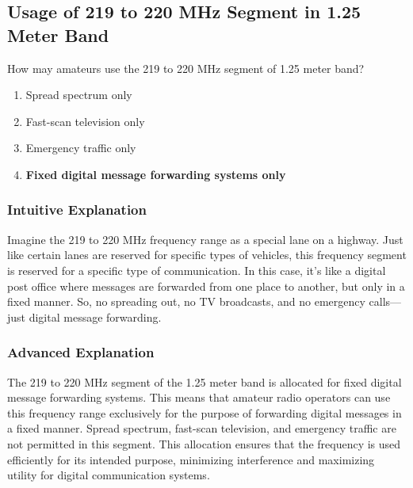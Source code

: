 \subsection{Usage of 219 to 220 MHz Segment in 1.25 Meter Band}
\label{T1B05}

\begin{tcolorbox}[colback=gray!10!white,colframe=black!75!black,title=T1B05]
How may amateurs use the 219 to 220 MHz segment of 1.25 meter band?
\begin{enumerate}[label=\Alph*,noitemsep]
    \item Spread spectrum only
    \item Fast-scan television only
    \item Emergency traffic only
    \item \textbf{Fixed digital message forwarding systems only}
\end{enumerate}
\end{tcolorbox}

\subsubsection{Intuitive Explanation}
Imagine the 219 to 220 MHz frequency range as a special lane on a highway. Just like certain lanes are reserved for specific types of vehicles, this frequency segment is reserved for a specific type of communication. In this case, it's like a digital post office where messages are forwarded from one place to another, but only in a fixed manner. So, no spreading out, no TV broadcasts, and no emergency calls—just digital message forwarding.

\subsubsection{Advanced Explanation}
The 219 to 220 MHz segment of the 1.25 meter band is allocated for fixed digital message forwarding systems. This means that amateur radio operators can use this frequency range exclusively for the purpose of forwarding digital messages in a fixed manner. Spread spectrum, fast-scan television, and emergency traffic are not permitted in this segment. This allocation ensures that the frequency is used efficiently for its intended purpose, minimizing interference and maximizing utility for digital communication systems.